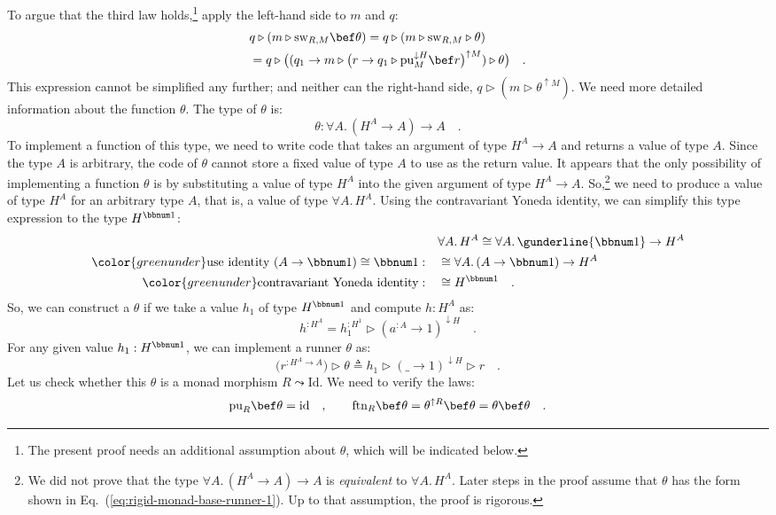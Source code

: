 To argue that the third law holds,\footnote{The present proof needs an additional assumption about $\theta$,
which will be indicated below.} apply the left-hand side to $m$ and $q$:
\begin{align}
 & q\triangleright(m\triangleright\text{sw}_{R,M}\bef\theta)=q\triangleright(m\triangleright\text{sw}_{R,M}\triangleright\theta)\nonumber \\
 & =q\triangleright\big((q_{1}\rightarrow m\triangleright\big(r\rightarrow q_{1}\triangleright\text{pu}_{M}^{\downarrow H}\bef r\big)^{\uparrow M})\triangleright\theta\big)\quad.\label{eq:rigid-monad-1-derivation7}
\end{align}
This expression cannot be simplified any further; and neither can
the right-hand side, $q\triangleright(m\triangleright\theta^{\uparrow M})$.
We need more detailed information about the function $\theta$. The
type of $\theta$ is:
\[
\theta:\forall A.\,(H^{A}\rightarrow A)\rightarrow A\quad.
\]
To implement a function of this type, we need to write code that takes
an argument of type $H^{A}\rightarrow A$ and returns a value of type
$A$. Since the type $A$ is arbitrary, the code of $\theta$ cannot
store a fixed value of type $A$ to use as the return value. It appears
that the only possibility of implementing a function $\theta$ is
by substituting a value of type $H^{A}$ into the given argument of
type $H^{A}\rightarrow A$. So,\footnote{We did not prove that the type $\forall A.\,(H^{A}\rightarrow A)\rightarrow A$
is \emph{equivalent} to $\forall A.\,H^{A}$. Later steps in the proof
assume that $\theta$ has the form shown in Eq.~(\ref{eq:rigid-monad-base-runner-1}).
Up to that assumption, the proof is rigorous.} we need to produce a value of type $H^{A}$ for an arbitrary type
$A$, that is, a value of type $\forall A.\,H^{A}$. Using the contravariant
Yoneda identity, we can simplify this type expression to the type
$H^{\bbnum 1}$:
\begin{align*}
 & \forall A.\,H^{A}\cong\forall A.\,\gunderline{\bbnum 1}\rightarrow H^{A}\\
{\color{greenunder}\text{use identity }(A\rightarrow\bbnum 1)\cong\bbnum 1:}\quad & \cong\forall A.\,(A\rightarrow\bbnum 1)\rightarrow H^{A}\\
{\color{greenunder}\text{contravariant Yoneda identity}:}\quad & \cong H^{\bbnum 1}\quad.
\end{align*}
So, we can construct a $\theta$ if we take a value $h_{1}$ of type
$H^{\bbnum 1}$ and compute $h:H^{A}$ as:
\[
h^{:H^{A}}=h_{1}^{:H^{1}}\triangleright(a^{:A}\rightarrow1)^{\downarrow H}\quad.
\]
For any given value $h_{1}:H^{\bbnum 1}$, we can implement a runner
$\theta$ as:
\begin{equation}
\big(r^{:H^{A}\rightarrow A}\big)\triangleright\theta\triangleq h_{1}\triangleright(\_\rightarrow1)^{\downarrow H}\triangleright r\quad.\label{eq:rigid-monad-base-runner-1}
\end{equation}
Let us check whether this $\theta$ is a monad morphism $R\leadsto\text{Id}$.
We need to verify the laws:
\[
\text{pu}_{R}\bef\theta=\text{id}\quad,\quad\quad\text{ftn}_{R}\bef\theta=\theta^{\uparrow R}\bef\theta=\theta\bef\theta\quad.
\]

